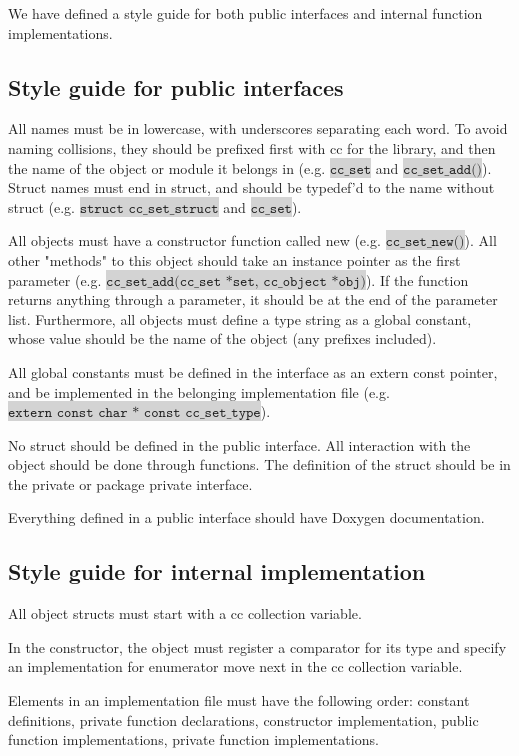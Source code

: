 \documentclass[table]{ituthesis}
\newcommand{\highlight}[1]{\colorbox{lightGray}{$\displaystyle \texttt{#1}$}}
\begin{document}
	We have defined a style guide for both public interfaces and internal function implementations.

	\subsection{Style guide for public interfaces}\label{sec:arch_style_public}
	
		\begin{description}
			\item All names must be in lowercase, with underscores separating each word. To avoid naming collisions, they should be prefixed first with cc for the library, and then the name of the object or module it belongs in (e.g. \highlight{cc\_set} and \highlight{cc\_set\_add()}). Struct names must end in struct, and should be typedef'd to the name without struct (e.g. \highlight{struct cc\_set\_struct} and \highlight{cc\_set}).
			\item All objects must have a constructor function called new (e.g. \highlight{cc\_set\_new()}). All other "methods" to this object should take an instance pointer as the first parameter (e.g. \highlight{cc\_set\_add(cc\_set *set, cc\_object *obj)}). If the function returns anything through a parameter, it should be at the end of the parameter list. Furthermore, all objects must define a type string as a global constant, whose value should be the name of the object (any prefixes included).
			\item All global constants must be defined in the interface as an extern const pointer, and be implemented in the belonging implementation file (e.g. \highlight{extern const char * const cc\_set\_type}).
			\item No struct should be defined in the public interface. All interaction with the object should be done through functions. The definition of the struct should be in the private or package private interface.
			\item Everything defined in a public interface should have Doxygen documentation.
		\end{description}
	
	\subsection{Style guide for internal implementation}\label{sec:arch_style_internal}
	
		\begin{description}
			\item All object structs must start with a cc collection variable.
			\item In the constructor, the object must register a comparator for its type and specify an
			implementation for enumerator move next in the cc collection variable.
			\item Elements in an implementation file must have the following order: constant definitions, private function declarations, constructor implementation, public function implementations, private function implementations.
		\end{description}
		
\end{document}

